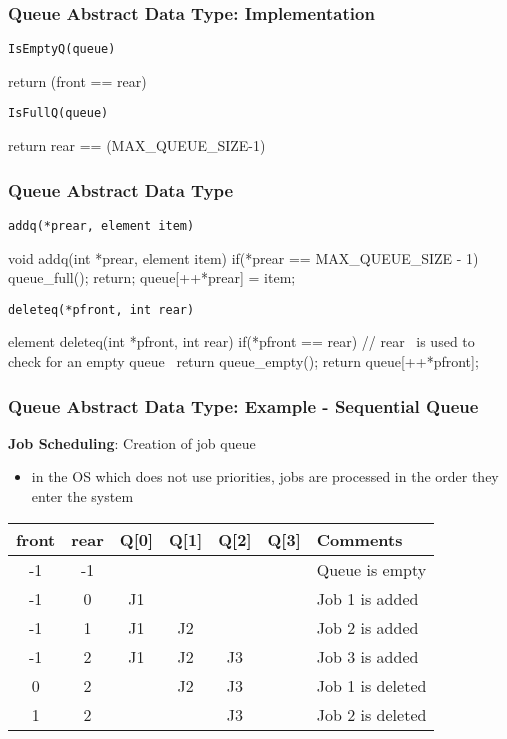 \documentclass[newPxFont,sthlmFooter,nooffset]{beamer}
\begin{document}
\begin{frame}[t, fragile]
  \frametitle{Queue Abstract Data Type: Implementation}
\texttt{IsEmptyQ(queue)}
\begin{codedef}
return (front == rear)
\end{codedef}
\texttt{IsFullQ(queue)}
\begin{codedef}
return rear == (MAX_QUEUE_SIZE-1)
\end{codedef}


\end{frame}

\begin{frame}[t, fragile]
  \frametitle{Queue Abstract Data Type}
\texttt{addq(*prear, element item)}
\begin{ncodedef}
void addq(int *prear, element item){
    if(*prear == MAX_QUEUE_SIZE - 1){
        queue_full();
        return;
    }
    queue[++*prear] = item;
}
\end{ncodedef}

\texttt{deleteq(*pfront, int rear)}
\begin{ncodedef}
element deleteq(int *pfront, int rear){
    if(*pfront == rear){ // rear ~is used to check for an empty queue~
        return queue_empty();
    }
    return queue[++*pfront];
}
\end{ncodedef}
\end{frame}

\begin{frame}[t]
  \frametitle{Queue Abstract Data Type: Example - Sequential Queue}
\textbf{Job Scheduling}: Creation of job queue
\begin{itemize}
\item in the OS which does not use priorities, jobs are processed in the order they enter the system
\end{itemize}
\begin{tabular}{c | c | c c c c | l}
  front & rear & Q[0] & Q[1] & Q[2] & Q[3] & Comments \\ \hline \hline
    -1  &  -1  &      &      &      &      & Queue is empty \\
    -1  &   0  &  J1  &      &      &      & Job 1 is added \\
    -1  &   1  &  J1  &  J2  &      &      & Job 2 is added \\
    -1  &   2  &  J1  &  J2  &  J3  &      & Job 3 is added \\
     0  &   2  &      &  J2  &  J3  &      & Job 1 is deleted \\
     1  &   2  &      &      &  J3  &      & Job 2 is deleted \\
\end{tabular}
\end{frame}
\end{document}
